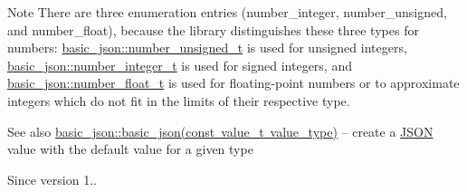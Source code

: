 \begin{DoxyNote}{Note}
There are three enumeration entries (number\+\_\+integer, number\+\_\+unsigned, and number\+\_\+float), because the library distinguishes these three types for numbers\+: \mbox{\hyperlink{classnlohmann_1_1basic__json_ab906e29b5d83ac162e823ada2156b989}{basic\+\_\+json\+::number\+\_\+unsigned\+\_\+t}} is used for unsigned integers, \mbox{\hyperlink{classnlohmann_1_1basic__json_a98e611d67b7bd75307de99c9358ab2dc}{basic\+\_\+json\+::number\+\_\+integer\+\_\+t}} is used for signed integers, and \mbox{\hyperlink{classnlohmann_1_1basic__json_a88d6103cb3620410b35200ee8e313d97}{basic\+\_\+json\+::number\+\_\+float\+\_\+t}} is used for floating-\/point numbers or to approximate integers which do not fit in the limits of their respective type.
\end{DoxyNote}
\begin{DoxySeeAlso}{See also}
\mbox{\hyperlink{classnlohmann_1_1basic__json_aed115142bd0c6c66c864700e0467df55}{basic\+\_\+json\+::basic\+\_\+json(const value\+\_\+t value\+\_\+type)}} -- create a \mbox{\hyperlink{usuario_8h_ab6104b89642419db4e355b7b2e40abbe}{J\+S\+ON}} value with the default value for a given type
\end{DoxySeeAlso}
\begin{DoxySince}{Since}
version 1.. 
\end{DoxySince}
